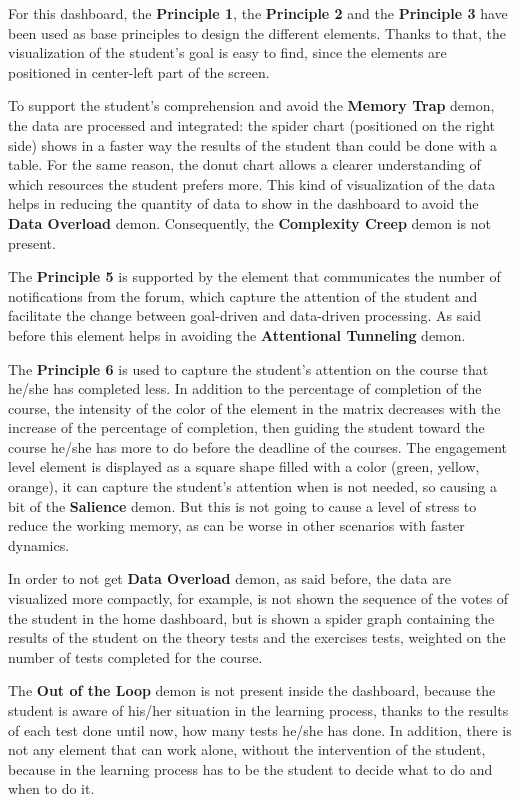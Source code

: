 For this dashboard, the \textbf{Principle 1}, the \textbf{Principle 2} and the \textbf{Principle 3}
have been used as base principles to design the different elements. Thanks to that, the 
visualization of the student's goal is easy to find, since the elements are positioned in center-left
part of the screen. 

To support the student's comprehension and avoid the 
\textbf{Memory Trap} demon, the data are processed and integrated: the spider chart
(positioned on the right side) shows in a faster way the results of the student than
could be done with a table. For the same reason, the donut chart allows a clearer 
understanding of which resources the student prefers more. This kind of visualization of the
data helps in reducing the quantity of data to show in the dashboard to 
avoid the \textbf{Data Overload} demon. Consequently, the \textbf{Complexity Creep} demon is not present.

The \textbf{Principle 5} is supported by the element that communicates the number of 
notifications from the forum, which capture the attention of the student and
facilitate the change between goal-driven and data-driven processing. As said before
this element helps in avoiding the \textbf{Attentional Tunneling} demon.

The \textbf{Principle 6} is used to capture the student's attention on the course that
he/she has completed less. In addition to the percentage of completion of the course,
the intensity of the color of the element in the matrix decreases with the increase
of the percentage of completion, then guiding the student toward the course he/she has more to
do before the deadline of the courses. The engagement level element is displayed as a square
shape filled with a color (green, yellow, orange), it can capture the student's attention when is not needed, so 
causing a bit of the \textbf{Salience} demon. But this is not going to cause a
level of stress to reduce the working memory, as can be worse in other scenarios with 
faster dynamics.

In order to not get \textbf{Data Overload} demon, as said before, the data are visualized
more compactly, for example, is not shown the sequence of the votes of the student in
the home dashboard, but is shown a spider graph containing the results of the student on the
theory tests and the exercises tests, weighted on the number of tests completed for the course.

The \textbf{Out of the Loop} demon is not present inside the dashboard, because
the student is aware of his/her situation in the learning process, thanks to the results of each
test done until now, how many tests he/she has done. In addition, there is not any 
element that can work alone, without the intervention of the student, because in the 
learning process has to be the student to decide what to do and when to do it.

